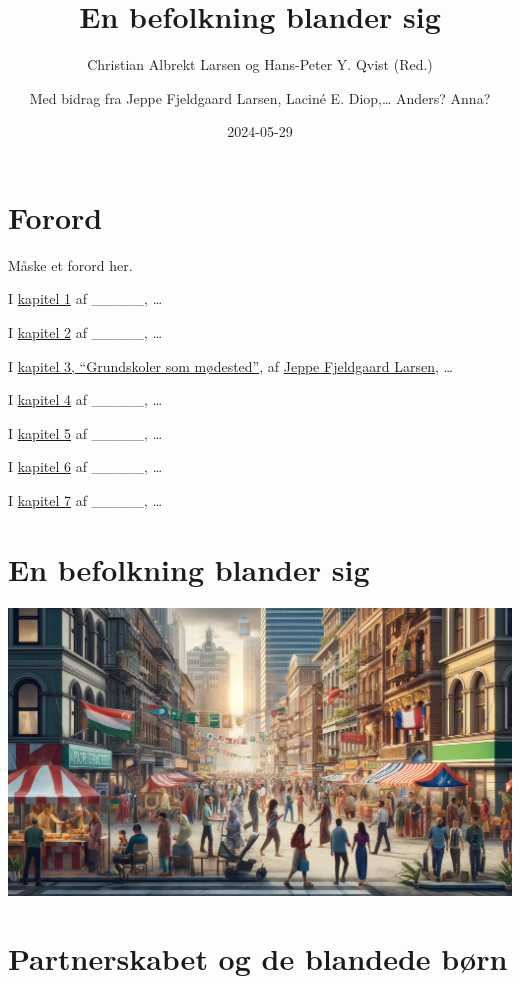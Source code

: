 \documentclass[
]{book}
\title{En befolkning blander sig}
\author{Christian Albrekt Larsen og Hans-Peter Y. Qvist (Red.) \and Med bidrag fra Jeppe Fjeldgaard Larsen, Laciné E. Diop,\ldots{} Anders? Anna?}
\date{2024-05-29}
\begin{document}
\maketitle

{
\setcounter{tocdepth}{1}
\tableofcontents
}
\chapter*{Forord}\label{forord}

Måske et forord her.

I \hyperref[kap1]{kapitel 1} af \_\_\_\_\_, \ldots{}

I \hyperref[kap2]{kapitel 2} af \_\_\_\_\_, \ldots{}

I \hyperref[kap3]{kapitel 3, ``Grundskoler som mødested''}, af \href{https://vbn.aau.dk/da/persons/140717}{Jeppe Fjeldgaard Larsen}, \ldots{}

I \hyperref[kap4]{kapitel 4} af \_\_\_\_\_, \ldots{}

I \hyperref[kap5]{kapitel 5} af \_\_\_\_\_, \ldots{}

I \hyperref[kap6]{kapitel 6} af \_\_\_\_\_, \ldots{}

I \hyperref[kap7]{kapitel 7} af \_\_\_\_\_, \ldots{}

\chapter{En befolkning blander sig}\label{kap1}

\includegraphics[width=1\linewidth]{images/dalle-smeltedige}

\chapter{Partnerskabet og de blandede børn}\label{kap2}
\end{document}
